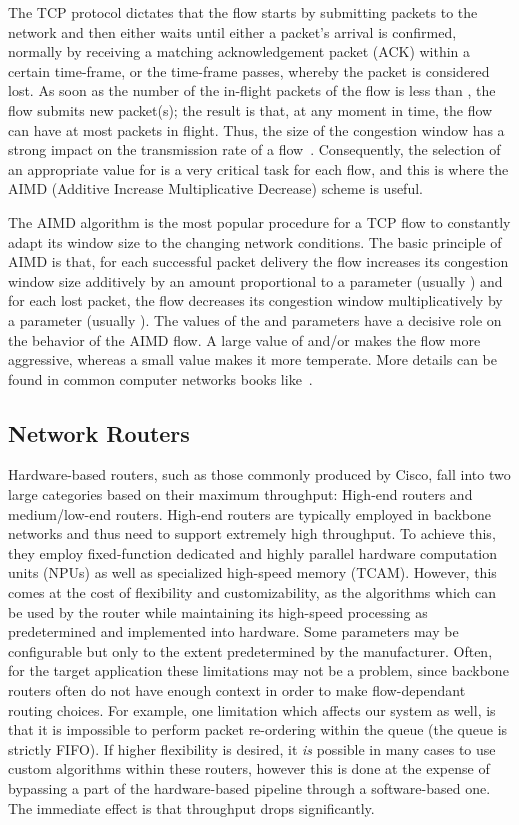 \documentclass[letterpaper,10pt]{llncs}
\begin{document}
The TCP protocol dictates that the flow starts by submitting  packets to
the network and then either waits until either a packet’s arrival is confirmed, 
normally by receiving a matching acknowledgement packet (ACK) within a certain time-frame,
or the time-frame passes, whereby the packet is considered lost.
As soon as the number of the in-flight packets of the flow is less than , the flow submits
new packet(s); the result is that, at any moment in time, the flow can have at most  packets in flight. Thus, the size  of the
congestion window has a strong impact on the transmission rate of a flow~\cite{Ja88}. Consequently, the selection of an appropriate value for 
is a very critical task for each flow, and this is where the AIMD (Additive Increase Multiplicative Decrease) scheme is useful. 

The AIMD algorithm
is the most popular procedure for a TCP flow to constantly adapt its window size to the changing network conditions.
The basic principle of AIMD is that, for each successful packet delivery the flow increases its congestion window size additively
by an amount proportional to a parameter  (usually ) and for each lost packet, the flow decreases its congestion
window multiplicatively by a parameter  (usually ). The values of the  and  parameters have a decisive
role on the behavior of the AIMD flow. A large value of  and/or  makes the flow more aggressive, whereas a small value
makes it more temperate. More details can be found in common computer networks books like~\cite{Peterson:2007:Networks,Stevens:1994:Vol1}.

 
\subsection{Network Routers}
\label{sec:hw}
Hardware-based routers, such as those commonly produced by Cisco, fall into two large categories based on their maximum throughput: High-end routers and medium/low-end routers.
High-end routers are typically employed in backbone networks and thus need to support extremely high throughput. To achieve this, they employ fixed-function dedicated and highly parallel hardware computation units (NPUs) as well as specialized high-speed memory (TCAM).
However, this comes at the cost of flexibility and customizability, as the algorithms which can be used by the router while maintaining its high-speed processing as predetermined and implemented into hardware. Some parameters may be configurable but only to the extent predetermined by the manufacturer. Often, for the target application these limitations may not be a problem, since backbone routers often do not have enough context in order to make flow-dependant routing choices. For example, one limitation which affects our system as well, is that it is impossible to perform packet re-ordering within the queue (the queue is strictly FIFO).
If higher flexibility is desired, it \emph{is} possible in many cases to use custom algorithms within these routers, however this is done at the expense of bypassing a part of the hardware-based pipeline through a software-based one. The immediate effect is that throughput drops significantly.
\end{document}
